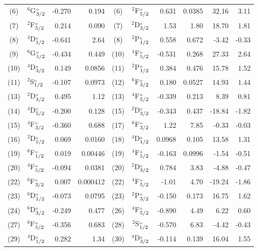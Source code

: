 \documentclass[8pt,a4paper, twoside]{report}
\begin{document}
\begin{table}[t!]
\begin{adjustwidth}{-.5in}{-.5in}
\begin{tabular}{cl@{\hspace{0.75cm}}r@{\hspace{0.75cm}}r@{\hspace{0.75cm}}|ccr@{\hspace{0.5cm}}r@{\hspace{0.5cm}}r@{\hspace{0.5cm}}r}
\midrule
 (6) & $^6$G$^{\rm_o}_{3/2}$  & -0.270   & 0.194 & (6) & $^2$F$^{\rm_o}_{5/2}$  &   0.631  & 0.0385 & 32.16 & 3.11  \\
(7) & $^2$F$^{\rm_o}_{5/2}$  & 0.214 &  0.090 & (7)  & $^2$D$^{\rm_o}_{3/2}$ & 1.53  &  1.80 & 18.70 & 1.81  \\
(8) & $^4$D$^{\rm_o}_{1/2}$   & -0.641   & 2.64 & (8) &  $^2$P$^{\rm_o}_{1/2}$  & 0.558 &  0.672 & -3.42 & -0.33 \\
 (9) & $^6$G$^{\rm_o}_{5/2}$  & -0.434   & 0.449 & (10) & $^4$F$^{\rm_o}_{5/2}$    & -0.531 &  0.268 & 27.33 & 2.64  \\
 (10) & $^4$D$^{\rm_o}_{3/2}$   & 0.149   &  0.0856 & (11) & $^2$P$^{\rm_o}_{1/2}$    & 0.384 & 0.476 & 15.78 & 1.52  \\
 (11) &$^2$S$^{\rm_o}_{1/2}$    & -0.107  & 0.0973 &(12)  & $^6$F$^{\rm_o}_{3/2}$ & 0.180 &  0.0527 & 14.93 & 1.44  \\
 (13) &$^2$D$^{\rm_o}_{3/2}$    & 0.495   & 1.12 & (13) & $^4$F$^{\rm_o}_{5/2}$  &    -0.339 & 0.213 & 8.39 & 0.81 \\
 (14) &$^4$D$^{\rm_o}_{5/2}$   & -0.200   &  0.128 & (15) & $^2$D$^{\rm_o}_{3/2}$  &   -0.343  & 0.437 & -18.84 & -1.82    \\
 (15) &$^4$F$^{\rm_o}_{3/2}$  & -0.360   & 0.688 & (17)  & $^6$F$^{\rm_o}_{3/2}$  &    1.22  & 7.85 & -0.33 & -0.03  \\
 (16) &$^2$D$^{\rm_o}_{5/2}$    & 0.069   & 0.0160 & (18) & $^4$D$^{\rm_o}_{1/2}$  &    0.0968 & 0.105 & 13.58 & 1.31  \\
 (19) &$^6$F$^{\rm_o}_{1/2}$   &   0.019   & 0.00446 & (19) & $^4$F$^{\rm_o}_{5/2}$ &    -0.163 & 0.0996& -1.54 & -0.51 \\
 (20) &$^4$F$^{\rm_o}_{5/2}$   &  -0.094   & 0.0381 & (20) & $^2$D$^{\rm_o}_{3/2}$  &    0.784 & 3.83 & -4.88 & -0.47 \\
 (22) &$^6$F$^{\rm_o}_{3/2}$  & 0.007   & 0.000412 & (22) & $^4$F$^{\rm_o}_{5/2}$  &    -1.01 & 4.70  & -19.24 & -1.86 \\
 (23) &$^6$D$^{\rm_o}_{1/2}$    & -0.073   & 0.0795 & (23)  & $^2$P$^{\rm_o}_{3/2}$  &   -0.150 & 0.173 & 16.75 & 1.62 \\
 (24) &$^6$D$^{\rm_o}_{3/2}$ & -0.249   & 0.477 & (26) & $^4$F$^{\rm_o}_{5/2}$  &    -0.890 & 4.49  & 6.22 & 0.60 \\
 (27) &$^6$F$^{\rm_o}_{5/2}$   & -0.356   & 0.683 & (28) & $^2$S$^{\rm_o}_{1/2}$ &     -0.570 & 6.83 & -4.42 & -0.43 \\
 (29) &$^4$D$^{\rm_o}_{1/2}$   &  0.282   & 1.34 & (30) & $^4$D$^{\rm_o}_{3/2}$ &   -0.114 & 0.139 & 16.04 & 1.55  \\

\end{tabular}
\end{adjustwidth}
\end{table}
\end{document}
